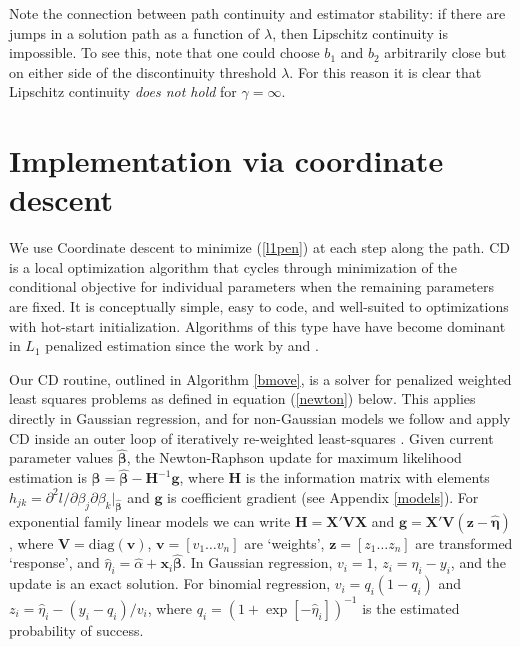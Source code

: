\documentclass[12pt]{article}
\newcommand{\bs}[1]{\boldsymbol{#1}}
\newcommand{\mr}[1]{\mathrm{#1}}
\newcommand{\bm}[1]{\mathbf{#1}}
\begin{document}
Note the connection between path continuity and estimator stability: if there
are jumps in a solution path as a function of $\lambda$, then Lipschitz
continuity is impossible. To see this, note that one could choose $b_1$ and
$b_2$ arbitrarily close but on either side of the discontinuity threshold
$\lambda$.  For this reason it is clear that Lipschitz continuity {\it does not
hold} for $\gamma =\infty$.

\section{Implementation via coordinate descent}
\label{implement}

We use Coordinate descent \citep[CD; e.g.,][]{luenberger_linear_2008} to minimize
(\ref{l1pen}) at each step along the path. CD is a local optimization
algorithm that cycles through minimization of the conditional objective for
individual parameters when the remaining parameters are fixed.  It is
conceptually simple, easy to code, and well-suited to optimizations with
hot-start initialization. Algorithms of this type have have become dominant in
$L_1$ penalized estimation since the work by \citet{friedman_pathwise_2007} and
\citet{wu_coordinate_2008}.

Our CD routine, outlined in Algorithm \ref{bmove}, is a solver for penalized
weighted least squares problems as defined in equation (\ref{newton}) below.
This applies directly in Gaussian regression, and for non-Gaussian models  we
follow \citet{friedman_regularization_2010} and apply CD inside an outer loop
of iteratively re-weighted least-squares \citep[IRLS;
e.g.,][]{green_iteratively_1984}. Given current parameter values
$\bs{\hat\beta}$, the Newton-Raphson update for maximum likelihood estimation
is $\bs{\beta} = \bs{\hat\beta} - \bm{H}^{-1}\bm{g}$, where $\bm{H}$ is the
information matrix with elements $h_{jk} = \partial^2 l/\partial
\beta_j\partial \beta_k |_{\bs{\hat\beta}}$ and $\bm{g}$ is coefficient
gradient (see Appendix \ref{models}). For exponential family linear models we
can write $\bm{H} = \bm{X}'\bm{V}\bm{X}$ and $\bm{g} = \bm{X}'\bm{V}(\bm{z} -
\bs{\hat\eta})$, where $\bm{V} = \mr{diag}(\bm{v})$, $\bm{v} = [v_1\ldots
v_n]$ are `weights', $\bm{z} = [z_1\ldots z_n]$ are transformed `response',
and $\hat\eta_i = \hat\alpha + \bm{x}_i\bs{\hat\beta}$.  In Gaussian
regression,  $v_i = 1$, $z_i=\hat\eta_i - y_i$, and the update is an exact
solution. For binomial regression, $v_i = q_i(1-q_i)$ and $z_i = \hat\eta_i -
(y_i-q_i)/v_i$, where $q_i = (1 + \exp[-\hat\eta_i])^{-1}$ is the  estimated
probability of success.
\end{document}
